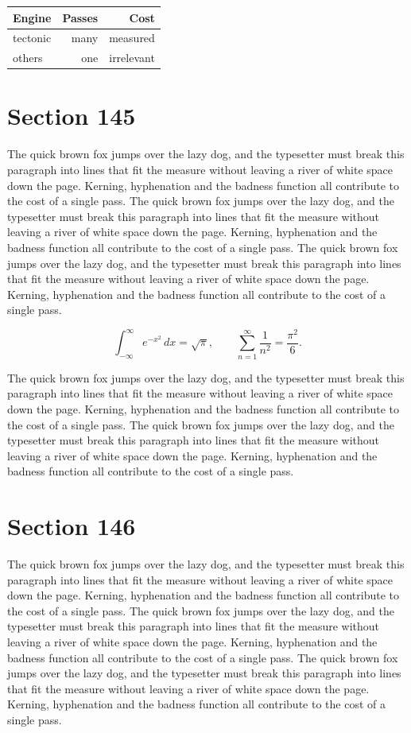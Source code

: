 \documentclass{article}
\begin{document}
\begin{center}
\begin{tabular}{lrr}
\toprule
Engine & Passes & Cost \\
\midrule
tectonic & many & measured \\
others & one & irrelevant \\
\bottomrule
\end{tabular}
\end{center}

\section{Section 145}
The quick brown fox jumps over the lazy dog, and the typesetter must break this paragraph into lines that fit the measure without leaving a river of white space down the page. Kerning, hyphenation and the badness function all contribute to the cost of a single pass. The quick brown fox jumps over the lazy dog, and the typesetter must break this paragraph into lines that fit the measure without leaving a river of white space down the page. Kerning, hyphenation and the badness function all contribute to the cost of a single pass. The quick brown fox jumps over the lazy dog, and the typesetter must break this paragraph into lines that fit the measure without leaving a river of white space down the page. Kerning, hyphenation and the badness function all contribute to the cost of a single pass. 

\begin{equation}
\int_{-\infty}^{\infty} e^{-x^{2}}\,dx = \sqrt{\pi}, \qquad
\sum_{n=1}^{\infty} \frac{1}{n^{2}} = \frac{\pi^{2}}{6}.
\end{equation}

The quick brown fox jumps over the lazy dog, and the typesetter must break this paragraph into lines that fit the measure without leaving a river of white space down the page. Kerning, hyphenation and the badness function all contribute to the cost of a single pass. The quick brown fox jumps over the lazy dog, and the typesetter must break this paragraph into lines that fit the measure without leaving a river of white space down the page. Kerning, hyphenation and the badness function all contribute to the cost of a single pass. 
\section{Section 146}
The quick brown fox jumps over the lazy dog, and the typesetter must break this paragraph into lines that fit the measure without leaving a river of white space down the page. Kerning, hyphenation and the badness function all contribute to the cost of a single pass. The quick brown fox jumps over the lazy dog, and the typesetter must break this paragraph into lines that fit the measure without leaving a river of white space down the page. Kerning, hyphenation and the badness function all contribute to the cost of a single pass. The quick brown fox jumps over the lazy dog, and the typesetter must break this paragraph into lines that fit the measure without leaving a river of white space down the page. Kerning, hyphenation and the badness function all contribute to the cost of a single pass. 
\end{document}
